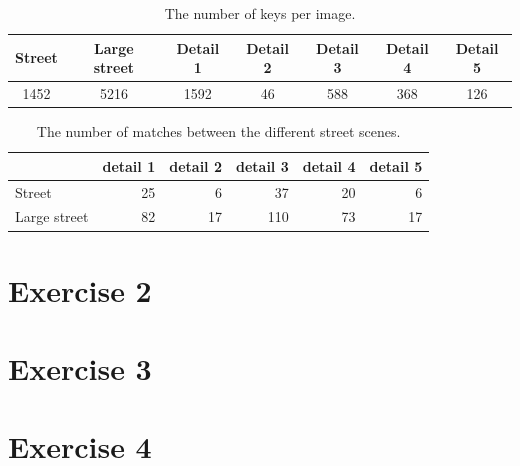 \documentclass[11pt,a4paper]{article}
\begin{document}
\begin{table}
    \centering
    \begin{tabular}{c|c|c|c|c|c|c}
        Street & Large street & Detail 1 & Detail 2 & Detail 3 & Detail 4 & Detail 5 \\
        \hline
        1452 & 5216 & 1592 & 46 & 588 & 368 & 126 \\
    \end{tabular}
    \caption{The number of keys per image.}
    \label{tab:streetkeys}
\end{table}

\begin{table}
    \centering
    \begin{tabular}{l|r|r|r|r|r|}
        & detail 1 & detail 2 & detail 3 & detail 4 & detail 5 \\
        \hline
        Street & 25 & 6 & 37 & 20 & 6 \\
        \hline
        Large street & 82 & 17 & 110 & 73 & 17 \\
        \hline
    \end{tabular}
    \caption{The number of matches between the different street scenes.}
    \label{tab:streetdetails}
\end{table}

\section*{Exercise 2}

\section*{Exercise 3}

\section*{Exercise 4}
\end{document}
